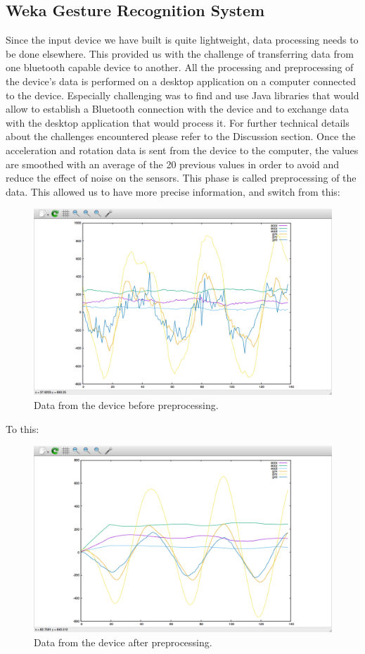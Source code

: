 \subsection{Weka Gesture Recognition System}
Since the input device we have built is quite lightweight, data processing needs to be done elsewhere.
This provided us with the challenge of transferring data from one bluetooth capable device to another.
All the processing and preprocessing of the device's data is performed on a desktop application on a 
computer connected to the device.
Especially challenging was to find and use Java libraries that would allow to establish a Bluetooth 
connection with the device and to exchange data with the desktop application that would process it. 
For further technical details about the challenges encountered please refer to the Discussion section. 
Once the acceleration and rotation data is sent from the device to the computer,
 the values are smoothed with an average of the 20 previous values in order to avoid and reduce the effect of noise on the sensors.
 This phase is called preprocessing of the data. 
 This allowed us to have more precise information, and switch from this:

\begin{figure}[!h]
\centering
\includegraphics[width=0.9\columnwidth]{img/raw}
\caption{Data from the device before preprocessing.}
\label{fig:figure2}
\end{figure}

To this:

\begin{figure}[!h]
\centering
\includegraphics[width=0.9\columnwidth]{img/20}
\caption{Data from the device after preprocessing.}
\label{fig:figure3}
\end{figure}

